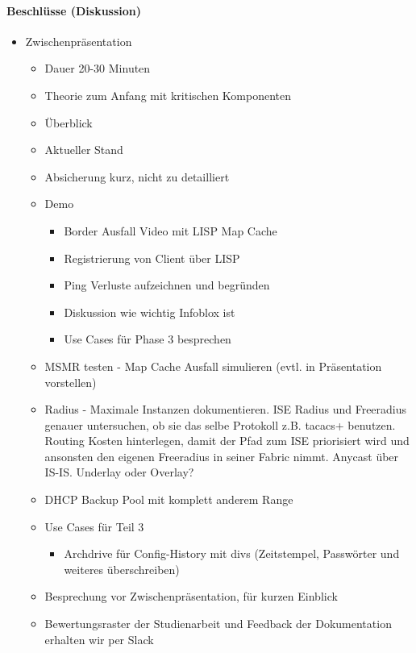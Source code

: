 \paragraph{Beschlüsse (Diskussion)}
\begin{itemize}	
	\item Zwischenpräsentation
	\begin{itemize}
		\item Dauer 20-30 Minuten
		\item Theorie zum Anfang mit kritischen Komponenten
		\item Überblick
		\item Aktueller Stand
		\item Absicherung kurz, nicht zu detailliert
		\item Demo 
		\begin{itemize}
			\item Border Ausfall Video mit LISP Map Cache
			\item Registrierung von Client über LISP 
			\item Ping Verluste aufzeichnen und begründen
		\item Diskussion wie wichtig Infoblox ist
		\item Use Cases für Phase 3 besprechen
	\end{itemize}	
	\item MSMR testen - Map Cache Ausfall simulieren (evtl. in Präsentation vorstellen)
	\item Radius - Maximale Instanzen dokumentieren. ISE Radius und Freeradius genauer untersuchen, ob sie das selbe Protokoll z.B. tacacs+ benutzen. Routing Kosten hinterlegen, damit der Pfad zum ISE priorisiert wird und ansonsten den eigenen Freeradius in seiner Fabric nimmt. Anycast über IS-IS. Underlay oder Overlay?
	\item DHCP Backup Pool mit komplett anderem Range
	\item Use Cases für Teil 3
	\begin{itemize}
		\item Archdrive für Config-History mit divs (Zeitstempel, Passwörter und weiteres überschreiben)
	\end{itemize}
	\item Besprechung vor Zwischenpräsentation, für kurzen Einblick
	\item Bewertungsraster der Studienarbeit und Feedback der Dokumentation erhalten wir per Slack
\end{itemize}


\end{itemize}
